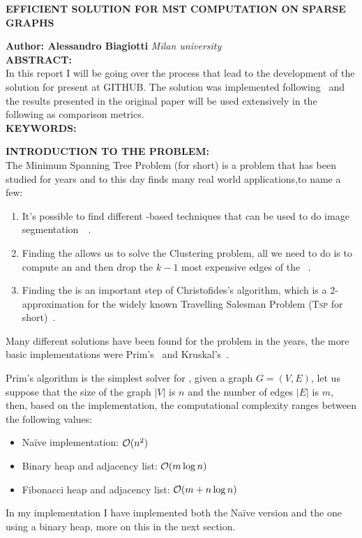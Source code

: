 \documentclass[a4paper,10pt]{article}
\begin{document}
\noindent
\begin{center}
	\textbf{{EFFICIENT SOLUTION FOR MST COMPUTATION ON SPARSE GRAPHS}} \\
\end{center}

\noindent
\textbf{Author: Alessandro Biagiotti} \hfill \textit{Milan university}
\\

\noindent
\textbf{ABSTRACT:}
\\
In this report I will be going over the process that lead to the development of the solution for \mst present at GITHUB. The solution was implemented following~\cite{generic-he-boruvka} and the results presented in the original paper will be used extensively in the following as comparison metrics.
\\

\noindent
\textbf{KEYWORDS:}
\\

\bigskip

\makeatletter{}\makeatother\label{sec:intro}
\noindent
\textbf{INTRODUCTION TO THE PROBLEM:}
\\
The Minimum Spanning Tree Problem (\mstp for short) is a problem that has been studied for years and to this day finds many real world applications,to name a few:
\begin{enumerate}
	\item It's possible to find different \mst-based techniques that can be used to do image segmentation~\cite{maze-generation}~\cite{mst-segmentation-heuristic}.
	\item Finding the \mst allows us to solve the Clustering problem, all we need to do is to compute an \mst and then drop the $k - 1$ most expensive edges of the \mst~\cite{mst-applications}.
	\item Finding the \mst is an important step of Christofides's algorithm, which is a 2-approximation for the widely known Travelling Salesman Problem (\textsc{Tsp} for short)~\cite{tsp-christofides}.
\end{enumerate}

Many different solutions have been found for the problem in the years, the more basic implementations were Prim's~\cite{prim-algorithm} and Kruskal's~\cite{kruskal-algorithm}.

Prim's algorithm is the simplest solver for \mstp, given a graph $G= (V, E)$, let us suppose that the size of the graph $|V|$ is $n$ and the number of edges $|E|$ is $m$, then, based on the implementation, the computational complexity ranges between the following values:
\begin{itemize}
	\item Naïve implementation: $\mathcal{O}(n^2)$
	\item Binary heap and adjacency list: $\mathcal{O}(m\log{n})$
	\item Fibonacci heap and adjacency list: $\mathcal{O}(m + n\log{n})$
\end{itemize}
In my implementation I have implemented both the Naïve version and the one using a binary heap, more on this in the next section.
\end{document}
